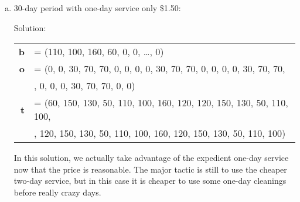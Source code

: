 \documentclass[a4paper,12pt]{article}
\begin{document}
\begin{enumerate}[a)]
    \item 30-day period with one-day service only \$1.50:

      Solution:

      \begin{tabular}{r l}
        {\bf b}& = (110, 100, 160, 60, 0, 0, \dots , 0)\\
        {\bf o}& = (0, 0, 30, 70, 70, 0, 0, 0, 0, 30, 70, 70, 0, 0, 0, 0, 30, 70, 70, \\
        {}& \quad 0, 0, 0, 0, 30, 70, 70, 0, 0)\\
        {\bf t}& = (60, 150, 130, 50, 110, 100, 160, 120, 120, 150, 130, 50, 110, 100, \\
        {}& \quad 160, 120, 150, 130, 50, 110, 100, 160, 120, 150, 130, 50, 110, 100)\\
      \end{tabular}

      In this solution, we actually take advantage of the expedient one-day service now that the
      price is reasonable. The major tactic is still to use the cheaper two-day service, but in this
      case it is cheaper to use some one-day cleanings before really crazy days.

\end{enumerate}
\end{document}
